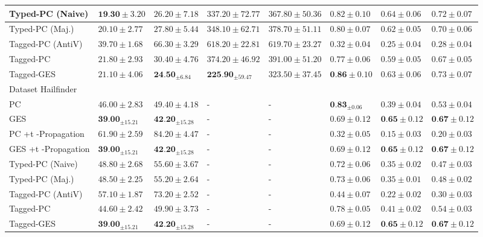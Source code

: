 \documentclass[10pt]{article}
\begin{document}
\begin{table}[h]
\begin{center}
\begin{tabular}{|l|l|l|l|l|l|l|l|}
\hline
Typed-PC (Naive) & $\mathbf{1 9 . 3 0} \pm 3.20$ & $26.20 \pm 7.18$ & $337.20 \pm 72.77$ & $367.80 \pm 50.36$ & $0.82 \pm 0.10$ & $0.64 \pm 0.06$ & $0.72 \pm 0.07$ \\
\hline
Typed-PC (Maj.) & $20.10 \pm 2.77$ & $27.80 \pm 5.44$ & $348.10 \pm 62.71$ & $378.70 \pm 51.11$ & $0.80 \pm 0.07$ & $0.62 \pm 0.05$ & $0.70 \pm 0.06$ \\
\hline
Tagged-PC (AntiV) & $39.70 \pm 1.68$ & $66.30 \pm 3.29$ & $618.20 \pm 22.81$ & $619.70 \pm 23.27$ & $0.32 \pm 0.04$ & $0.25 \pm 0.04$ & $0.28 \pm 0.04$ \\
\hline
Tagged-PC & $21.80 \pm 2.93$ & $30.40 \pm 4.76$ & $374.20 \pm 46.92$ & $391.00 \pm 51.20$ & $0.77 \pm 0.06$ & $0.59 \pm 0.05$ & $0.67 \pm 0.05$ \\
\hline
Tagged-GES & $21.10 \pm 4.06$ & $\mathbf{2 4 . 5 0}_{ \pm 6.84}$ & $\mathbf{2 2 5 . 9 0}_{ \pm 59.47}$ & $323.50 \pm 37.45$ & $\mathbf{0 . 8 6} \pm 0.10$ & $0.63 \pm 0.06$ & $0.73 \pm 0.07$ \\
\hline
Dataset Hailfinder & \multicolumn{7}{|c|}{} \\
\hline
PC & $46.00 \pm 2.83$ & $49.40 \pm 4.18$ & - & - & $\mathbf{0 . 8 3}_{ \pm 0.06}$ & $0.39 \pm 0.04$ & $0.53 \pm 0.04$ \\
\hline
GES & $\mathbf{3 9 . 0 0}_{ \pm 15.21}$ & $\mathbf{4 2 . 2 0}_{ \pm 15.28}$ & - & - & $0.69 \pm 0.12$ & $\mathbf{0 . 6 5} \pm 0.12$ & $\mathbf{0 . 6 7} \pm 0.12$ \\
\hline
PC +t -Propagation & $61.90 \pm 2.59$ & $84.20 \pm 4.47$ & - & - & $0.32 \pm 0.05$ & $0.15 \pm 0.03$ & $0.20 \pm 0.03$ \\
\hline
GES +t -Propagation & $\mathbf{3 9 . 0 0}_{ \pm 15.21}$ & $\mathbf{4 2 . 2 0}_{ \pm 15.28}$ & - & - & $0.69 \pm 0.12$ & $\mathbf{0 . 6 5} \pm 0.12$ & $\mathbf{0 . 6 7} \pm 0.12$ \\
\hline
Typed-PC (Naive) & $48.80 \pm 2.68$ & $55.60 \pm 3.67$ & - & - & $0.72 \pm 0.06$ & $0.35 \pm 0.02$ & $0.47 \pm 0.03$ \\
\hline
Typed-PC (Maj.) & $48.50 \pm 2.25$ & $55.20 \pm 2.64$ & - & - & $0.73 \pm 0.06$ & $0.35 \pm 0.01$ & $0.48 \pm 0.02$ \\
\hline
Tagged-PC (AntiV) & $57.10 \pm 1.87$ & $73.20 \pm 2.52$ & - & - & $0.44 \pm 0.07$ & $0.22 \pm 0.02$ & $0.30 \pm 0.03$ \\
\hline
Tagged-PC & $44.60 \pm 2.42$ & $49.90 \pm 3.73$ & - & - & $0.78 \pm 0.05$ & $0.41 \pm 0.02$ & $0.54 \pm 0.03$ \\
\hline
Tagged-GES & $\mathbf{3 9 . 0 0}_{ \pm 15.21}$ & $\mathbf{4 2 . 2 0}_{ \pm 15.28}$ & - & - & $0.69 \pm 0.12$ & $\mathbf{0 . 6 5} \pm 0.12$ & $\mathbf{0 . 6 7} \pm 0.12$ \\

\end{tabular}
\end{center}
\end{table}
\end{document}
